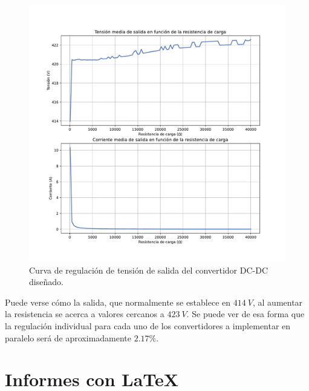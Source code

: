 \begin{figure}
	\centering
	\includegraphics[width=1\linewidth]{../salida_resistencia}
	\caption{Curva de regulación de tensión de salida del convertidor DC-DC diseñado.}
	\label{fig:salidaresistencia}
\end{figure}

Puede verse cómo la salida, que normalmente se establece en $414 \ V$, al aumentar la resistencia se acerca a valores cercanos a $423 \ V$. Se puede ver de esa forma que la regulación individual para cada uno de los convertidores a implementar en paralelo será de aproximadamente $2.17 \%$.












\clearpage

\section{Informes con \LaTeX}


